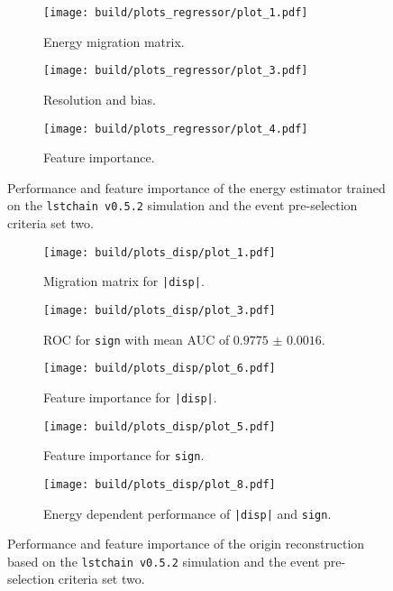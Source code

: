 \begin{figure}
    \centering
    \begin{subfigure}{0.49\textwidth}
        \centering
        \texttt{[image: build/plots\_regressor/plot\_1.pdf]}
        \caption{Energy migration matrix.}
    \end{subfigure}
    \hfill
    \begin{subfigure}{0.49\textwidth}
        \centering
        \texttt{[image: build/plots\_regressor/plot\_3.pdf]}
        \caption{Resolution and bias.}
        \label{fig:regressor_newMC_150_bias}
    \end{subfigure}
    \newline\vfill
    \begin{subfigure}{0.7\textwidth}
        \centering
        \texttt{[image: build/plots\_regressor/plot\_4.pdf]}
        \caption{Feature importance.}
    \end{subfigure}
    \caption{Performance and feature importance of the energy estimator trained on the \texttt{lstchain v0.5.2} simulation and the event pre-selection criteria set two.}
    \label{fig:regressor_newMC_150}
\end{figure}

\begin{figure}
    \centering
    \begin{subfigure}{0.49\textwidth}
        \centering
        \texttt{[image: build/plots\_disp/plot\_1.pdf]}
        \caption{Migration matrix for \texttt{|disp|}.}
    \end{subfigure}
    \hfill
    \begin{subfigure}{0.49\textwidth}
        \centering
        \texttt{[image: build/plots\_disp/plot\_3.pdf]}
        \caption{ROC for \texttt{sign} with mean AUC of $\num{0.9775(16)}$.}
    \end{subfigure}
    \newline\vfill
    \begin{subfigure}{0.49\textwidth}
        \centering
        \texttt{[image: build/plots\_disp/plot\_6.pdf]}
        \caption{Feature importance for \texttt{|disp|}.}
    \end{subfigure}
    \hfill
    \begin{subfigure}{0.49\textwidth}
        \centering
        \texttt{[image: build/plots\_disp/plot\_5.pdf]}
        \caption{Feature importance for \texttt{sign}.}
    \end{subfigure}
    \newline\vfill
    \begin{subfigure}{0.7\textwidth}
        \centering
        \texttt{[image: build/plots\_disp/plot\_8.pdf]}
        \caption{Energy dependent performance of \texttt{|disp|} and \texttt{sign}.}
        \label{fig:origin_newMC_150_e}
    \end{subfigure}
    \caption{Performance and feature importance of the origin reconstruction based on the \texttt{lstchain v0.5.2} simulation and the event pre-selection criteria set two.}
    \label{fig:origin_newMC_150}
\end{figure}

